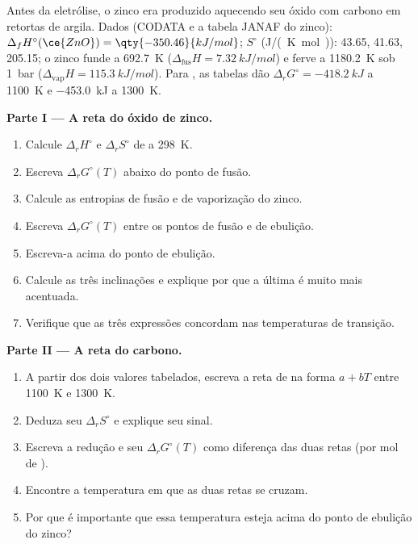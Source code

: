 \begin{problem}
\label{pb:b2:ellingham:1}
Antes da eletrólise, o zinco era produzido aquecendo seu óxido com carbono em
retortas de argila. Dados (CODATA e a tabela JANAF do zinco): $\Delta_f H^\circ(\ce{ZnO})
= \qty{-350.46}{kJ/mol}$; $S^\circ$ (\unit{J/(K.mol)}):  43.65, 
41.63,  205.15; o zinco funde a \qty{692.7}{K} ($\Delta_{\text{fus}}H =
\qty{7.32}{kJ/mol}$) e ferve a \qty{1180.2}{K} sob \qty{1}{bar}
($\Delta_{\text{vap}}H = \qty{115.3}{kJ/mol}$). Para , as
tabelas dão $\Delta_r G^\circ = \qty{-418.2}{kJ}$ a \qty{1100}{K} e
\qty{-453.0}{kJ} a \qty{1300}{K}.

\medskip
\noindent\textbf{Parte I --- A reta do óxido de zinco.}
\begin{enumerate}
  \item Calcule $\Delta_r H^\circ$ e $\Delta_r S^\circ$ de  a \qty{298}{K}.
  \item Escreva $\Delta_r G^\circ(T)$ abaixo do ponto de fusão.
  \item Calcule as entropias de fusão e de vaporização do zinco.
  \item Escreva $\Delta_r G^\circ(T)$ entre os pontos de fusão e de ebulição.
  \item Escreva-a acima do ponto de ebulição.
  \item Calcule as três inclinações e explique por que a última é muito mais acentuada.
  \item Verifique que as três expressões concordam nas temperaturas de transição.
\end{enumerate}

\medskip
\noindent\textbf{Parte II --- A reta do carbono.}
\begin{enumerate}[resume]
  \item A partir dos dois valores tabelados, escreva a reta de  na
        forma $a + bT$ entre \qty{1100}{K} e \qty{1300}{K}.
  \item Deduza seu $\Delta_r S^\circ$ e explique seu sinal.
  \item Escreva a redução  e seu $\Delta_r
        G^\circ(T)$ como diferença das duas retas (por mol de ).
  \item Encontre a temperatura em que as duas retas se cruzam.
  \item Por que é importante que essa temperatura esteja acima do ponto de
        ebulição do zinco?
\end{enumerate}


\end{problem}
